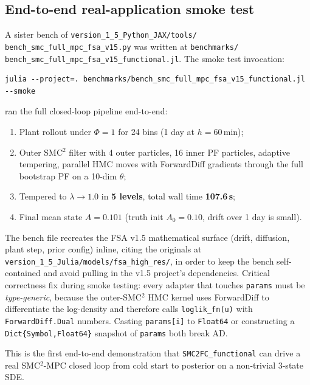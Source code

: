 \documentclass[11pt,a4paper]{article}
\begin{document}
\subsection{End-to-end real-application smoke test}
\label{sec:smoke}

A sister bench of \texttt{version\_1\_5\_Python\_JAX/tools/}
\texttt{bench\_smc\_full\_mpc\_fsa\_v15.py} was written at
\texttt{benchmarks/}\\
\texttt{bench\_smc\_full\_mpc\_fsa\_v15\_functional.jl}. The smoke test
invocation:

\begin{lstlisting}
julia --project=. benchmarks/bench_smc_full_mpc_fsa_v15_functional.jl --smoke
\end{lstlisting}

ran the full closed-loop pipeline end-to-end:

\begin{enumerate}[leftmargin=*]
\item Plant rollout under $\Phi=1$ for 24 bins (1 day at $h{=}60$\,min);
\item Outer SMC$^2$ filter with 4 outer particles, 16 inner PF particles,
adaptive tempering, parallel HMC moves with ForwardDiff gradients through
the full bootstrap PF on a 10-dim $\theta$;
\item Tempered to $\lambda \to 1.0$ in \textbf{5 levels}, total wall time
\textbf{107.6\,s};
\item Final mean state $A = 0.101$ (truth init $A_0 = 0.10$, drift over
1 day is small).
\end{enumerate}

The bench file recreates the FSA v1.5 mathematical surface (drift,
diffusion, plant step, prior config) inline, citing the originals at
\texttt{version\_1\_5\_Julia/models/fsa\_high\_res/}, in order to keep
the bench self-contained and avoid pulling in the v1.5 project's
dependencies. Critical correctness fix during smoke testing: every
adapter that touches \texttt{params} must be \emph{type-generic}, because
the outer-SMC$^2$ HMC kernel uses ForwardDiff to differentiate the
log-density and therefore calls \texttt{loglik\_fn(u)} with
\texttt{ForwardDiff.Dual} numbers. Casting \texttt{params[i]} to
\texttt{Float64} or constructing a \texttt{Dict\{Symbol,Float64\}}
snapshot of \texttt{params} both break AD.

This is the first end-to-end demonstration that \texttt{SMC2FC\_functional}
can drive a real SMC$^2$-MPC closed loop from cold start to posterior on
a non-trivial 3-state SDE.
\end{document}
